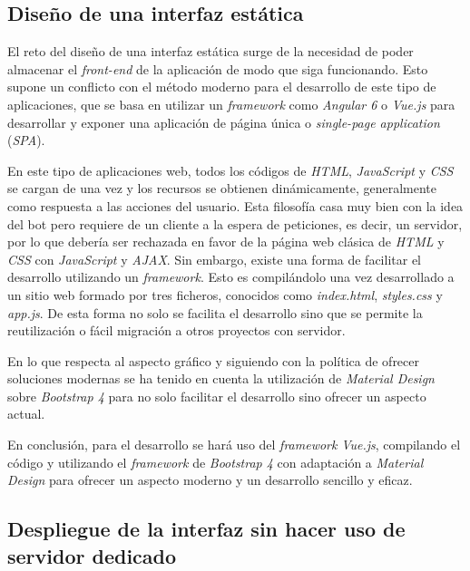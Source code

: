 \documentclass[11pt,spanish,listoffigures]{tfgetsinf}
\begin{document}
\subsection{Diseño de una interfaz estática}
\label{subsec:diseño-interfaz-estatica}

El reto del diseño de una interfaz estática surge de la necesidad de poder almacenar el \textit{front-end} de la aplicación de modo que siga funcionando. Esto supone un conflicto con el método moderno para el desarrollo de este tipo de aplicaciones, que se basa en utilizar un \textit{framework} como \textit{Angular 6} o \textit{Vue.js} para desarrollar y exponer una aplicación de página única o \textit{single-page application} (\textit{SPA}).

En este tipo de aplicaciones web, todos los códigos de \textit{HTML}, \textit{JavaScript} y \textit{CSS} se cargan de una vez y los recursos se obtienen dinámicamente, generalmente como respuesta a las acciones del usuario. Esta filosofía casa muy bien con la idea del bot pero requiere de un cliente a la espera de peticiones, es decir, un servidor, por lo que debería ser rechazada en favor de la página web clásica de \textit{HTML} y \textit{CSS} con \textit{JavaScript} y \textit{AJAX}. Sin embargo, existe una forma de facilitar el desarrollo utilizando un \textit{framework}. Esto es compilándolo una vez desarrollado a un sitio web formado por tres ficheros, conocidos como \textit{index.html}, \textit{styles.css} y \textit{app.js}. De esta forma no solo se facilita el desarrollo sino que se permite la reutilización o fácil migración a otros proyectos con servidor.

En lo que respecta al aspecto gráfico y siguiendo con la política de ofrecer soluciones modernas se ha tenido en cuenta la utilización de \textit{Material Design} sobre  \textit{Bootstrap 4} para no solo facilitar el desarrollo sino ofrecer un aspecto actual.

En conclusión, para el desarrollo se hará uso del \textit{framework} \textit{Vue.js}, compilando el código y utilizando el \textit{framework} de \textit{Bootstrap 4} con adaptación a \textit{Material Design} para ofrecer un aspecto moderno y un desarrollo sencillo y eficaz.

\subsection{Despliegue de la interfaz sin hacer uso de servidor dedicado}
\label{subsec:despliegue-interfaz}
\end{document}
